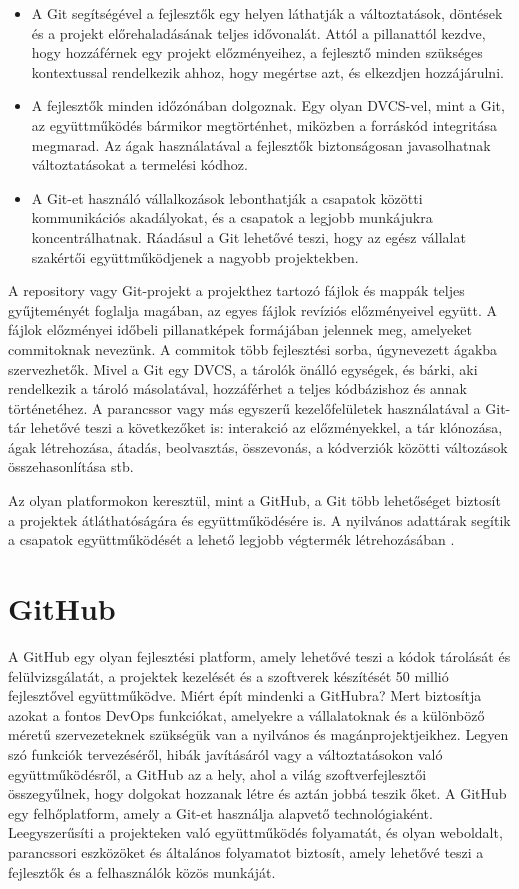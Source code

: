 \begin{itemize}
  \item A Git segítségével a fejlesztők egy helyen láthatják a változtatások, döntések és a projekt előrehaladásának teljes idővonalát. Attól a pillanattól kezdve, hogy hozzáférnek egy projekt előzményeihez, a fejlesztő minden szükséges kontextussal rendelkezik ahhoz, hogy megértse azt, és elkezdjen hozzájárulni.
  \item A fejlesztők minden időzónában dolgoznak. Egy olyan DVCS-vel, mint a Git, az együttműködés bármikor megtörténhet, miközben a forráskód integritása megmarad. Az ágak használatával a fejlesztők biztonságosan javasolhatnak változtatásokat a termelési kódhoz.
  \item A Git-et használó vállalkozások lebonthatják a csapatok közötti kommunikációs akadályokat, és a csapatok a legjobb munkájukra koncentrálhatnak. Ráadásul a Git lehetővé teszi, hogy az egész vállalat szakértői együttműködjenek a nagyobb projektekben.
\end{itemize}

A repository vagy Git-projekt a projekthez tartozó fájlok és mappák teljes gyűjteményét foglalja magában, az egyes fájlok revíziós előzményeivel együtt.
A fájlok előzményei időbeli pillanatképek formájában jelennek meg, amelyeket commitoknak nevezünk.
A commitok több fejlesztési sorba, úgynevezett ágakba szervezhetők. Mivel a Git egy DVCS, a tárolók önálló egységek, és bárki, aki rendelkezik a tároló másolatával, hozzáférhet a teljes kódbázishoz és annak történetéhez.
A parancssor vagy más egyszerű kezelőfelületek használatával a Git-tár lehetővé teszi a következőket is: interakció az előzményekkel, a tár klónozása, ágak létrehozása, átadás, beolvasztás, összevonás, a kódverziók közötti változások összehasonlítása stb.

Az olyan platformokon keresztül, mint a GitHub, a Git több lehetőséget biztosít a projektek átláthatóságára és együttműködésére is.
A nyilvános adattárak segítik a csapatok együttműködését a lehető legjobb végtermék létrehozásában \cite{git}.

\section{GitHub}
A GitHub egy olyan fejlesztési platform, amely lehetővé teszi a kódok tárolását és felülvizsgálatát, a projektek kezelését és a szoftverek készítését 50 millió fejlesztővel együttműködve.
Miért épít mindenki a GitHubra? Mert biztosítja azokat a fontos DevOps funkciókat, amelyekre a vállalatoknak és a különböző méretű szervezeteknek szükségük van a nyilvános és magánprojektjeikhez.
Legyen szó funkciók tervezéséről, hibák javításáról vagy a változtatásokon való együttműködésről, a GitHub az a hely, ahol a világ szoftverfejlesztői összegyűlnek, hogy dolgokat hozzanak létre és aztán jobbá teszik őket.
A GitHub egy felhőplatform, amely a Git-et használja alapvető technológiaként.
Leegyszerűsíti a projekteken való együttműködés folyamatát, és olyan weboldalt, parancssori eszközöket és általános folyamatot biztosít, amely lehetővé teszi a fejlesztők és a felhasználók közös munkáját.

